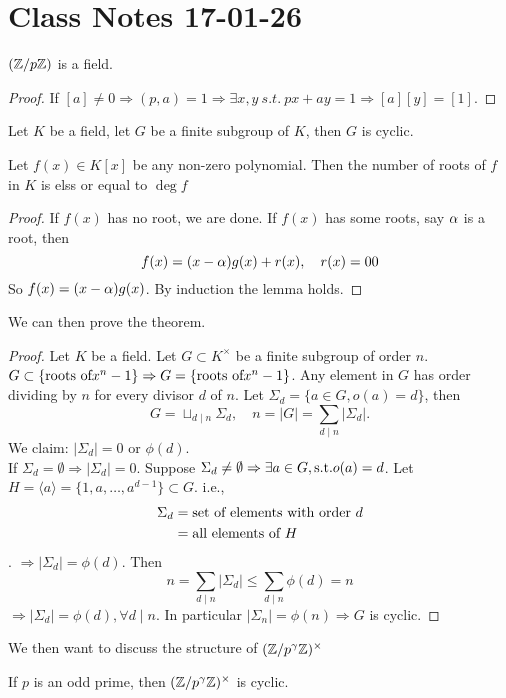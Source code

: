 \section{Class Notes 17-01-26}
\begin{theorem}
	$(\mathbb{Z}/p\mathbb{Z})$ is a field.
\end{theorem}
\begin{proof}
	If $[a]\ne0 \Rightarrow (p,a) = 1 \Rightarrow \exists x,y\ s.t.\ px+ay = 1\Rightarrow [a][y] = [1]$.
\end{proof}
\begin{theorem}
	Let $K$ be a field, let $G$ be a finite subgroup of $K$, then $G$ is cyclic.
\end{theorem}
\begin{lemma}
	Let $f(x)\in K[x]$ be any non-zero polynomial. Then the number of roots of $f$ in $K$ is elss or equal to $\deg{f}$
\end{lemma}
\begin{proof}
If $f(x)$ has no root, we are done. If $f(x)$ has some roots, say $\alpha$ is a root, then $$f(x) = (x-\alpha)g(x)+ r(x),\quad r(x) = 00$$So $f(x) = (x-\alpha)g(x)$. By induction the lemma holds.
\end{proof}
We can then prove the theorem.
\begin{proof}
	Let $K$ be a field. Let $G\subset K^{\times}$ be a finite subgroup of order $n$. $G\subset \{\hbox{roots of} x^n-1\}\Rightarrow G = \{\hbox{roots of} x^n -1\}$. Any element in $G$ has order dividing by $n$ for every divisor $d$ of $n$. Let $\Sigma_d = \{a\in G, o(a) = d\}$, then $$G=\sqcup_{d\mid n} \Sigma_d, \quad n=|G| = \sum_{d\mid n}|\Sigma_d|.$$
	We claim: $|\Sigma_d| = 0$ or $\phi(d)$.\\
	If $\Sigma_d = \emptyset\Rightarrow |\Sigma_d| = 0$. Suppose $\Sigma_d\ne \emptyset\Rightarrow \exists a\in G, \hbox{s.t.} o(a) = d$. Let $H =\langle a\rangle = \{1,a,\ldots, a^{d-1}\}\subset G.$
	i.e.,\begin{align*}\Sigma_d &=\hbox{set of elements with order } d\\
	&= \hbox{all elements of } H
	\end{align*}.
	$\Rightarrow |\Sigma_d| = \phi(d)$. Then $$n=\sum_{d\mid n}|\Sigma_d|\le \sum_{d\mid n}\phi(d) = n$$
	$\Rightarrow |\Sigma_d| = \phi(d), \forall d\mid n$. In particular $|\Sigma_n| = \phi(n)\Rightarrow G$ is cyclic.
\end{proof}
We then want to discuss the structure of $(\mathbb{Z}/p^{\gamma}\mathbb{Z})^{\times}$
\begin{theorem}
	If $p$ is an odd prime, then $(\mathbb{Z}/p^{\gamma}\mathbb{Z})^{\times}$ is cyclic.
\end{theorem}
